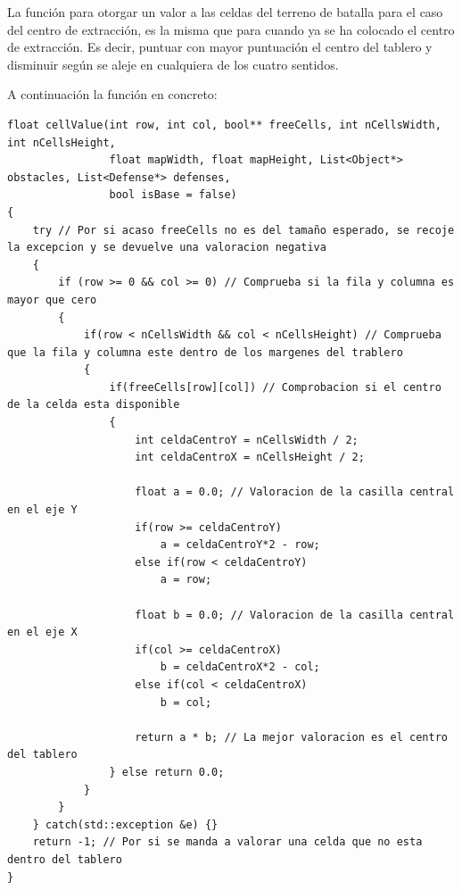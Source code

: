 La función para otorgar un valor a las celdas del terreno de batalla
para el caso del centro de extracción, es la misma que para cuando ya
se ha colocado el centro de extracción. Es decir, puntuar con mayor
puntuación el centro del tablero y disminuir según se aleje en
cualquiera de los cuatro sentidos.

A continuación la función en concreto:

\lstset{language=C++, texcl=true}
\begin{lstlisting}[frame=single]
float cellValue(int row, int col, bool** freeCells, int nCellsWidth, int nCellsHeight,
                float mapWidth, float mapHeight, List<Object*> obstacles, List<Defense*> defenses,
                bool isBase = false)
{
    try // Por si acaso freeCells no es del tamaño esperado, se recoje la excepcion y se devuelve una valoracion negativa
    {
        if (row >= 0 && col >= 0) // Comprueba si la fila y columna es mayor que cero
        {
            if(row < nCellsWidth && col < nCellsHeight) // Comprueba que la fila y columna este dentro de los margenes del trablero
            {
                if(freeCells[row][col]) // Comprobacion si el centro de la celda esta disponible
                {
                    int celdaCentroY = nCellsWidth / 2;
                    int celdaCentroX = nCellsHeight / 2;

                    float a = 0.0; // Valoracion de la casilla central en el eje Y
                    if(row >= celdaCentroY)
                        a = celdaCentroY*2 - row;
                    else if(row < celdaCentroY)
                        a = row;

                    float b = 0.0; // Valoracion de la casilla central en el eje X
                    if(col >= celdaCentroX)
                        b = celdaCentroX*2 - col;
                    else if(col < celdaCentroX)
                        b = col;

                    return a * b; // La mejor valoracion es el centro del tablero
                } else return 0.0;
            }
        }
    } catch(std::exception &e) {}
    return -1; // Por si se manda a valorar una celda que no esta dentro del tablero
}
\end{lstlisting}

